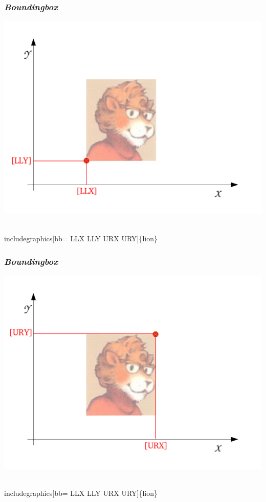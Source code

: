 \documentclass[svgnames,%
	ucs,%
	pdftex]{guitbeamer}
\begin{document}
\begin{frame}
  \frametitle{\textit{Boundingbox}}
	\begin{center}
	\includegraphics[width=.6\textwidth]{boundingbox_6}
	\end{center}
	\begin{LaTeXcode}
		\\includegraphics[bb= \alert{LLX LLY} URX URY]\{lion\}
	\end{LaTeXcode}
\end{frame}
\begin{frame}
  \frametitle{\textit{Boundingbox}}
	\begin{center}
	\includegraphics[width=.6\textwidth]{boundingbox_7}
	\end{center}
	\begin{LaTeXcode}
		\\includegraphics[bb= LLX LLY \alert{URX URY}]\{lion\}
	\end{LaTeXcode}
\end{frame}
\end{document}

